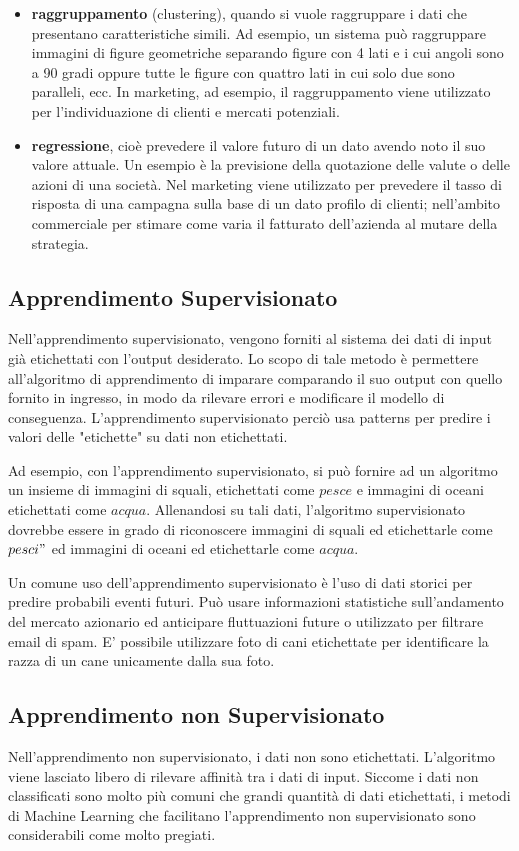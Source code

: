 \begin{itemize}
\item \textbf{raggruppamento} (clustering), quando si vuole raggruppare i dati che presentano caratteristiche simili. Ad esempio, un sistema può raggruppare immagini di figure geometriche separando figure con 4 lati e i cui angoli sono a 90 gradi oppure tutte le figure con quattro lati in cui solo due sono paralleli, ecc. In marketing, ad esempio, il raggruppamento viene utilizzato per l'individuazione di clienti e mercati potenziali.
\item \textbf{regressione}, cioè prevedere il valore futuro di un dato avendo noto il suo valore attuale. Un esempio è la previsione della quotazione delle valute o delle azioni di una società. Nel marketing viene utilizzato per prevedere il tasso di risposta di una campagna sulla base di un dato profilo di clienti; nell'ambito commerciale per stimare come varia il fatturato dell'azienda al mutare della strategia.
\end{itemize}

\subsection{Apprendimento Supervisionato}
Nell'apprendimento supervisionato, vengono forniti al sistema dei dati di input già etichettati con l'output desiderato. Lo scopo di tale metodo è permettere all'algoritmo di apprendimento di imparare comparando il suo output con quello fornito in ingresso, in modo da rilevare errori e modificare il modello di conseguenza. L'apprendimento supervisionato perciò usa patterns per predire i valori delle "etichette" su dati non etichettati.

Ad esempio, con l'apprendimento supervisionato, si può fornire ad un algoritmo un insieme di immagini di squali, etichettati come $pesce$ e immagini di oceani etichettati come $acqua$. Allenandosi su tali dati, l'algoritmo supervisionato dovrebbe essere in grado di riconoscere immagini di squali ed etichettarle come $pesci"$ ed immagini di oceani ed etichettarle come $acqua$.

Un comune uso dell'apprendimento supervisionato è l'uso di dati storici per predire probabili eventi futuri. Può usare informazioni statistiche sull'andamento del mercato azionario ed anticipare fluttuazioni future o utilizzato per filtrare email di spam. E' possibile utilizzare foto di cani etichettate per identificare la razza di un cane unicamente dalla sua foto.

\subsection{Apprendimento non Supervisionato}
Nell'apprendimento non supervisionato, i dati non sono etichettati. L'algoritmo viene lasciato libero di rilevare affinità tra i dati di input. Siccome i dati non classificati sono molto più comuni che grandi quantità di dati etichettati, i metodi di Machine Learning che facilitano l'apprendimento non supervisionato sono considerabili come molto pregiati.

